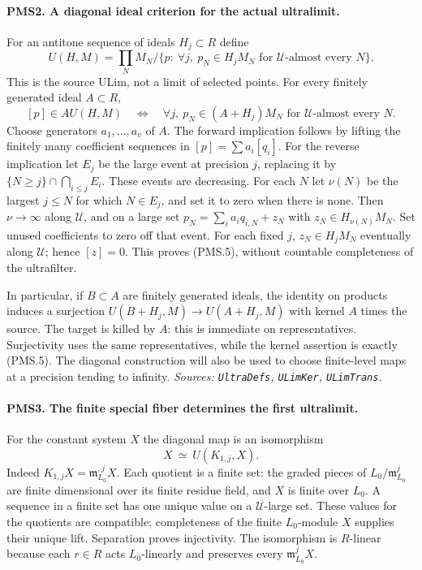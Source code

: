 \paragraph{PMS2. A diagonal ideal criterion for the actual ultralimit.}
\label{claim:PMS2}
For an antitone sequence of ideals $H_j\subset R$ define
\[
 U(H,M)=\prod_N M_N\Big/
 \{p:\ \forall j,\ p_N\in H_jM_N\text{ for }\mathscr U
       \text{-almost every }N\}.                  \tag{PMS.4}
\]
This is the source $\mathrm{ULim}$, not a limit of selected points.
For every finitely generated ideal $A\subset R$,
\[
 [p]\in A U(H,M)
 \quad\Longleftrightarrow\quad
 \forall j,\ p_N\in(A+H_j)M_N
                    \text{ for }\mathscr U\text{-almost every }N.
                                                        \tag{PMS.5}
\]
Choose generators $a_1,\ldots,a_v$ of $A$.  The forward implication
follows by lifting the finitely many coefficient sequences in
$[p]=\sum a_i[q_i]$.  For the reverse implication let $E_j$ be the
large event at precision $j$, replacing it by
$\{N\geq j\}\cap\bigcap_{i\leq j}E_i$.  These events are decreasing.
For each $N$ let $\nu(N)$ be the largest $j\leq N$ for which
$N\in E_j$, and set it to zero when there is none.  Then
$\nu\to\infty$ along $\mathscr U$, and on a large set
$p_N=\sum_i a_iq_{i,N}+z_N$ with $z_N\in H_{\nu(N)}M_N$.
Set unused coefficients to zero off that event.  For each fixed $j$,
$z_N\in H_jM_N$ eventually along $\mathscr U$; hence $[z]=0$.
This proves (PMS.5), without countable completeness of the ultrafilter.

In particular, if $B\subset A$ are finitely generated ideals, the
identity on products induces a surjection
$U(B+H_j,M)\to U(A+H_j,M)$ with kernel $A$ times the source.
The target is killed by $A$: this is immediate on representatives.
Surjectivity uses the same representatives, while the kernel assertion
is exactly (PMS.5).  The diagonal construction will also be used to
choose finite-level maps at a precision tending to infinity.
\hfill\textit{Sources: \texttt{UltraDefs}, \texttt{ULimKer},
\texttt{ULimTrans}.}

\paragraph{PMS3. The finite special fiber determines the first ultralimit.}
\label{claim:PMS3}
For the constant system $X$ the diagonal map is an isomorphism
\[
 X\ \simeq\ U(K_{1,j},X).                         \tag{PMS.6}
\]
Indeed $K_{1,j}X=\mathfrak m_{L_0}^{,j}X$.  Each quotient is a
finite set: the graded pieces of $L_0/\mathfrak m_{L_0}^j$ are finite
dimensional over its finite residue field, and $X$ is finite over
$L_0$.  A sequence in a finite set has one unique value on a
$\mathscr U$-large set.  These values for the quotients are compatible;
completeness of the finite $L_0$-module $X$ supplies their unique lift.
Separation proves injectivity.  The isomorphism is $R$-linear because
each $r\in R$ acts $L_0$-linearly and preserves every
$\mathfrak m_{L_0}^jX$.

